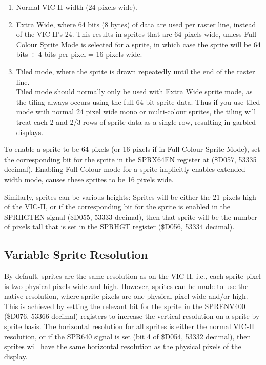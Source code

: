 \begin{enumerate}
\item Normal VIC-II width (24 pixels wide).
\item Extra Wide, where 64 bits (8 bytes) of data are used per raster line, instead of the VIC-II's 24.
  This results in sprites that are 64 pixels wide, unless Full-Colour Sprite Mode is selected for a sprite,
  in which case the sprite will be 64 bits $\div$ 4 bits per pixel = 16 pixels wide.
\item Tiled mode, where the sprite is drawn repeatedly until the end of the raster line. \\
  Tiled mode should normally only be used with Extra Wide sprite mode, as the tiling always occurs using the full 64 bit sprite data. Thus if you use tiled mode wtih normal 24 pixel wide mono or multi-colour sprites, the tiling will treat each 2 and 2/3 rows of sprite data as a single row, resulting in garbled displays.
\end{enumerate}

To enable a sprite to be 64 pixels (or 16 pixels if in Full-Colour Sprite Mode), set the corresponding bit for the sprite in the SPRX64EN register at (\$D057, 53335 decimal).  Enabling Full Colour mode for a sprite implicitly enables extended width mode, causes these sprites to be 16 pixels wide.

Similarly, sprites can be various heights:  Sprites will be either the 21 pixels high of the VIC-II, or if the corresponding bit for the sprite is enabled in the SPRHGTEN signal (\$D055, 53333 decimal), then that sprite will be the number of pixels tall that is set in the SPRHGT
register (\$D056, 53334 decimal).

\subsection{Variable Sprite Resolution}

By default, sprites are the same resolution as on the VIC-II, i.e., each sprite pixel is two physical pixels wide and high.
However, sprites can be made to use the native resolution, where sprite pixels are one physical pixel wide and/or high.
This is achieved by setting the relevant bit for the sprite in the SPRENV400 (\$D076, 53366 decimal) registers to increase the
vertical resolution on a sprite-by-sprite basis.  The horizontal resolution for all sprites is either the normal VIC-II resolution, or if the SPR640 signal
is set (bit 4 of \$D054, 53332 decimal), then sprites will have the same horizontal resolution as the physical pixels of the display.

